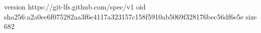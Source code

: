 version https://git-lfs.github.com/spec/v1
oid sha256:a2a0ec6f075282aa3f6e4117a323157c158f5910ab5069f328176bec56df6e5e
size 682
